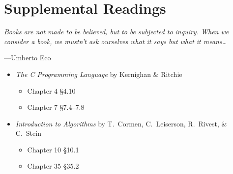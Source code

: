 \section{Supplemental Readings}

\epigraph{\emph{
Books are not made to be believed, but to be subjected to inquiry.
When we consider a book, we mustn't ask ourselves what it says but what it means\ldots
}}{---Umberto Eco}

\noindent
\begin{itemize}
  \item \textit{The C Programming Language} by Kernighan \& Ritchie
  \begin{itemize}
    \item Chapter 4 \S 4.10
    \item Chapter 7 \S 7.4--7.8
  \end{itemize}
  \item \textit{Introduction to Algorithms} by T.\ Cormen, C.\
    Leiserson, R.\ Rivest, \& C.\ Stein
    \begin{itemize}
      \item Chapter 10 \S 10.1
      \item Chapter 35 \S 35.2
    \end{itemize}
\end{itemize}

